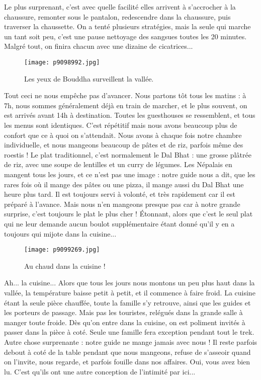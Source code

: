 \documentclass{book}
\begin{document}
Le plus surprenant, c'est avec quelle facilité elles arrivent à s'accrocher à la chaussure, remonter sous le pantalon, redescendre dans la chaussure, puis traverser la chaussette. On a tenté plusieurs stratégies, mais la seule qui marche un tant soit peu, c'est une pause nettoyage des sangsues toutes les 20 minutes. Malgré tout, on finira chacun avec une dizaine de cicatrices...


\begin{figure}[h]
\centering
\texttt{[image: p9098992.jpg]}
\caption*{Les yeux de Bouddha surveillent la vallée.}
\end{figure}

Tout ceci ne nous empêche pas d'avancer. Nous partons tôt tous les matins : à 7h, nous sommes généralement déjà en train de marcher, et le plus souvent, on est arrivés avant 14h à destination. Toutes les guesthouses se ressemblent, et tous les menus sont identiques. C'est répétitif mais nous avons beaucoup plus de confort que ce à quoi on s'attendait. Nous avons à chaque fois notre chambre individuelle, et nous mangeons beaucoup de pâtes et de riz, parfois même des roestis ! Le plat traditionnel, c'est normalement le Dal Bhat : une grosse plâtrée de riz, avec une soupe de lentilles et un curry de légumes. Les Népalais en mangent tous les jours, et ce n'est pas une image : notre guide nous a dit, que les rares fois où il mange des pâtes ou une pizza, il mange aussi du Dal Bhat une heure plus tard. Il est toujours servi à volonté, et très rapidement car il est préparé à l'avance. Mais nous n'en mangeons presque pas car à notre grande surprise, c'est toujours le plat le plus cher ! Étonnant, alors que c'est le seul plat qui ne leur demande aucun boulot supplémentaire étant donné qu'il y en a toujours qui mijote dans la cuisine...


\begin{figure}[h]
\centering
\texttt{[image: p9099269.jpg]}
\caption*{Au chaud dans la cuisine !}
\end{figure}

Ah... la cuisine... Alors que tous les jours nous montons un peu plus haut dans la vallée, la température baisse petit à petit, et il commence à faire froid. La cuisine étant la seule pièce chauffée, toute la famille s'y retrouve, ainsi que les guides et les porteurs de passage. Mais pas les touristes, relégués dans la grande salle à manger toute froide. Dès qu'on entre dans la cuisine, on est poliment invités à passer dans la pièce à coté. Seule une famille fera exception pendant tout le trek. Autre chose surprenante : notre guide ne mange jamais avec nous ! Il reste parfois debout à coté de la table pendant que nous mangeons, refuse de s'asseoir quand on l'invite, nous regarde, et parfois fouille dans nos affaires. Oui, vous avez bien lu. C'est qu'ils ont une autre conception de l'intimité par ici...
\end{document}
